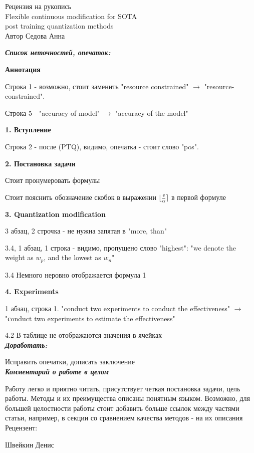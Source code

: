 \documentclass[DIV=16]{scrartcl}
\begin{document}
	
	\begin{LARGE}
	\begin{center}
		Рецензия на рукопись \\
		Flexible continuous modification for SOTA \\
		post training quantization methods \\
		Автор Седова Анна
	\end{center}
	\end{LARGE}

	\textit{\textbf{Список неточностей, опечаток:}}

	\textbf{Аннотация}
	
	Строка 1 - возможно, стоит заменить "resource constrained" $\rightarrow$ "resource-constrained".
	
	Строка 5 - "accuracy of model" $\rightarrow$ "accuracy of the model"
	
	\textbf{1. Вступление}
	
	Строка 2 - после (PTQ), видимо, опечатка - стоит слово "pos".
	
	\textbf{2. Постановка задачи}
	
	Стоит пронумеровать формулы
	
	Стоит пояснить обозначение скобок в выражении $\lfloor\frac{v}{\alpha}\rceil$ в первой формуле
	
	\textbf{3. Quantization modification}
	
	3 абзац, 2 строчка - не нужна запятая в "more, than"
	
	3.4, 1 абзац, 1 строка - видимо, пропущено слово "highest": "we denote the weight as $w_p$, and the lowest as $w_n$"
	
	3.4 Немного неровно отображается формула 1
	
	\textbf{4. Experiments}
	
	1 абзац, строка 1. "conduct two experiments to conduct the effectiveness" $\rightarrow$ "сonduct two experiments to estimate the effectiveness" 
	
	4.2 В таблице не отображаются значения в ячейках \\
	
	\textbf{\textit{Доработать:}}
	
	Исправить опечатки, дописать заключение \\
	
	\textbf{\textit{Комментарий о работе в целом}}
	
	Работу легко и приятно читать, присутствует четкая постановка задачи, цель работы. Методы и их преимущества описаны понятным языком. Возможно, для большей целостности работы стоит добавить больше ссылок между частями статьи, например, в секции со сравнением качества методов - на их описания \\
	
	Рецензент:
	
	Швейкин Денис
	
	
\end{document}
